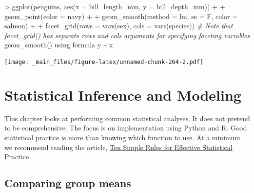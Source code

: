 \documentclass[
]{book}
\newenvironment{Shaded}{\begin{snugshade}}{\end{snugshade}}
\newcommand{\AttributeTok}[1]{\textcolor[rgb]{0.77,0.63,0.00}{#1}}
\newcommand{\CommentTok}[1]{\textcolor[rgb]{0.56,0.35,0.01}{\textit{#1}}}
\newcommand{\FunctionTok}[1]{\textcolor[rgb]{0.00,0.00,0.00}{#1}}
\newcommand{\NormalTok}[1]{#1}
\newcommand{\SpecialCharTok}[1]{\textcolor[rgb]{0.00,0.00,0.00}{#1}}
\newcommand{\StringTok}[1]{\textcolor[rgb]{0.31,0.60,0.02}{#1}}
\begin{document}
\begin{Shaded}
\begin{Highlighting}[]
\SpecialCharTok{\textgreater{}} \FunctionTok{ggplot}\NormalTok{(penguins, }\FunctionTok{aes}\NormalTok{(}\AttributeTok{x =}\NormalTok{ bill\_length\_mm, }\AttributeTok{y =}\NormalTok{ bill\_depth\_mm)) }\SpecialCharTok{+}
\SpecialCharTok{+}   \FunctionTok{geom\_point}\NormalTok{(}\AttributeTok{color =} \StringTok{\textquotesingle{}navy\textquotesingle{}}\NormalTok{) }\SpecialCharTok{+}
\SpecialCharTok{+}   \FunctionTok{geom\_smooth}\NormalTok{(}\AttributeTok{method =} \StringTok{\textquotesingle{}lm\textquotesingle{}}\NormalTok{, }\AttributeTok{se =}\NormalTok{ F, }\AttributeTok{color =} \StringTok{\textquotesingle{}salmon\textquotesingle{}}\NormalTok{) }\SpecialCharTok{+}
\SpecialCharTok{+}   \FunctionTok{facet\_grid}\NormalTok{(}\AttributeTok{rows =} \FunctionTok{vars}\NormalTok{(sex), }\AttributeTok{cols =} \FunctionTok{vars}\NormalTok{(species)) }\CommentTok{\# Note that facet\_grid() has separate \textasciigrave{}rows\textasciigrave{} and \textasciigrave{}cols\textasciigrave{} arguments for specifying faceting variables}
\StringTok{\textasciigrave{}}\AttributeTok{geom\_smooth()}\StringTok{\textasciigrave{}}\NormalTok{ using formula }\StringTok{\textquotesingle{}y \textasciitilde{} x\textquotesingle{}}
\end{Highlighting}
\end{Shaded}

\texttt{[image: \_main\_files/figure-latex/unnamed-chunk-264-2.pdf]}

\hypertarget{statistical-inference-and-modeling}{%
\chapter{Statistical Inference and Modeling}\label{statistical-inference-and-modeling}}

This chapter looks at performing common statistical analyses. It does not pretend to be comprehensive. The focus is on implementation using Python and R. Good statistical practice is more than knowing which function to use. At a minimum we recommend reading the article, \href{https://journals.plos.org/ploscompbiol/article?id=10.1371/journal.pcbi.1004961}{Ten Simple Rules for Effective Statistical Practice} \citep{kass_caffo_davidian_meng_yu_reid_2016}.

\hypertarget{comparing-group-means}{%
\section{Comparing group means}\label{comparing-group-means}}
\end{document}
